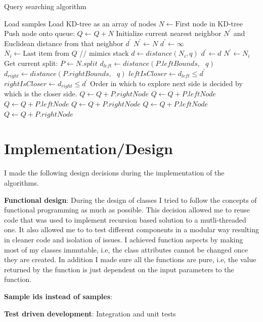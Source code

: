 \documentclass[11pt]{amsart}
\begin{document}
\begin{algorithm}
\caption{Query searching algorithm}
\label{query_searching}
\begin{algorithmic}[1]
\State Load samples
\State Load KD-tree as an array of nodes
\State
{}
\State $N \gets \text{First node in KD-tree}$
\State Push node onto queue: $Q \gets Q + N$
\State
\State Initialize current nearest neighbor $N^\prime$ and Euclidean distance from that neighbor $d^\prime$
\State $N^\prime \gets N$
\State $d^\prime \gets \infty$
\State
{}
\State $N_i \gets \text{Last item from } Q$ \hspace{0.5in}// mimics stack
\State $d \gets distance(N_i, q)$
\State $d^\prime \gets d$
\State $N^\prime \gets N_i$
\EndIf
\Else
\State Get current split: $P \gets N.split$
\State $d_{left} \gets distance(P.leftBounds,\text{ } q)$ 
\State $d_{right} \gets distance(P.rightBounds,\text{ } q)$ 
\State
\State $leftIsCloser \gets d_{left} \leq d^\prime$ 
\State $rightIsCloser \gets d_{right}  \leq d^\prime$ 
\State
{} 
\State Order in which to explore next side is decided by which is the closer side.
\State $Q \gets Q + P.rightNode$
\State $Q \gets Q + P.leftNode$
\Else
\State $Q \gets Q + P.leftNode$
\State $Q \gets Q + P.rightNode$
\EndIf
{} 
\State $Q \gets Q + P.leftNode$
\State $Q \gets Q + P.rightNode$
\EndIf
\EndIf
\EndWhile
\EndProcedure
\end{algorithmic}
\end{algorithm}


\section{Implementation/Design}

I made the following design decisions during the implementation of the algorithms.

\begin{list}{}{\leftmargin= 1.4cm} \setlength\itemsep{1em}

\item \textbf{Functional design}: During the design of classes I tried to follow the concepts of functional programming as much as possible. This decision allowed me to reuse code that was used to implement recursion based solution to a mutli-threaded one. It also allowed me to to test different components in a modular way resulting in cleaner code and isolation of issues. I achieved function aspects by making most of my classes immutable, i.e, the class attributes cannot be changed once they are created. In addition I made sure all the functions are pure, i.e, the value returned by the function is just dependent on the input parameters to the function.

\item \textbf{Sample ids instead of samples}:

\item \textbf{Test driven development}: Integration and unit tests


\end{list}


 
 
\end{document}
